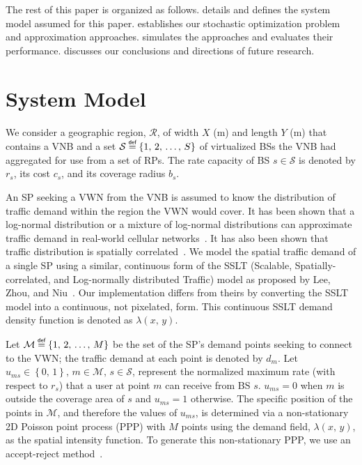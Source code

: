 \documentclass[conference]{IEEEtran}
\newcommand\defeq{\mathrel{\overset{\makebox[0pt]{\mbox{\normalfont\tiny\sffamily def}}}{=}}}
\begin{document}
The rest of this paper is organized as follows.   details and defines the system model assumed for this paper.   establishes our stochastic optimization problem and approximation approaches.   simulates the approaches and evaluates their performance.   discusses our conclusions and directions of future research.

\section{System Model} \label{sec:model}

We consider a geographic region, $\mathcal{R}$, of width $X$ (m) and length $Y$ (m) that contains a VNB and a set $\mathcal{S} \defeq \left\{ 1,\, 2,\, \ldots,\, S \right\}$ of virtualized BSs the VNB had aggregated for use from a set of RPs.  The rate capacity of BS $s \in \mathcal{S}$ is denoted by $r_s$, its cost $c_s$, and its coverage radius $b_s$.

An SP seeking a VWN from the VNB is assumed to know the distribution of traffic demand within the region the VWN would cover.  It has been shown that a log-normal distribution or a mixture of log-normal distributions can approximate traffic demand in real-world cellular networks~\cite{686105, 5936263}.  It has also been shown that traffic distribution is spatially correlated~\cite{5936263, eigenplaces}.  We model the spatial traffic demand of a single SP using a similar, continuous form of the SSLT (Scalable, Spatially-correlated, and Log-normally distributed Traffic) model as proposed by Lee, Zhou, and Niu~\cite{6554749}.  Our implementation differs from theirs by converting the SSLT model into a continuous, not pixelated, form.  This continuous SSLT demand density function is denoted as $\lambda \left( x,\, y \right)$.

Let $\mathcal{M} \defeq \left\{ 1,\, 2,\, \ldots,\, M \right\}$ be the set of the SP's demand points seeking to connect to the VWN; the traffic demand at each point is denoted by $d_m$.  Let $u_{ms} \in \left\{ 0,\, 1 \right\},\, m \in \mathcal{M},\, s \in \mathcal{S}$, represent the normalized maximum rate (with respect to $r_s$) that a user at point $m$ can receive from BS $s$.  $u_{ms} = 0$ when $m$ is outside the coverage area of $s$ and $u_{ms} = 1$ otherwise.  The specific position of the points in $\mathcal{M}$, and therefore the values of $u_{ms}$, is determined via a non-stationary 2D Poisson point process (PPP) with $M$ points using the demand field, $\lambda \left( x,\, y \right)$, as the spatial intensity function.  To generate this non-stationary PPP, we use an accept-reject method~\cite{leeds:nsPPPgeneration}.
\end{document}
